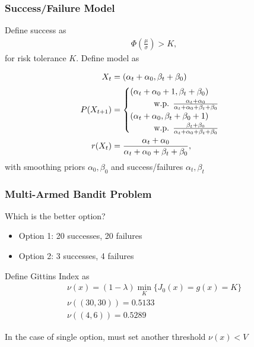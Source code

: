 \documentclass[compress, xcolor=pst]{beamer}
\newcommand\tab[1][1cm]{\hspace*{#1}}
\begin{document}
\begin{frame}
	\frametitle{\textbf{Success/Failure Model}}
	Define success as
	\begin{align*}
		\Phi(\frac{\mu}{\sigma}) > K,
	\end{align*}
	for risk tolerance $K$. Define model as

	\begin{align*}
	  X_t &= (\alpha_t + \alpha_0, \beta_t + \beta_0) \\
	  P(X_{t+1}) &=
	  \begin{cases}
	      (\alpha_t + \alpha_0 + 1, \beta_t + \beta_0)
	      \\ \tab\text{w.p. } \frac{\alpha_t + \alpha_0}{\alpha_t + \alpha_0 + \beta_t + \beta_0}\\
	      (\alpha_t + \alpha_0, \beta_t + \beta_0 + 1)
	      \\ \tab\text{w.p. } \frac{\beta_t + \beta_0}{\alpha_t + \alpha_0 + \beta_t + \beta_0}
	  \end{cases}\\
	  r(X_t) &= \frac{\alpha_t + \alpha_0}{\alpha_t + \alpha_0 + \beta_t + \beta_0},
	\end{align*}
	with smoothing priors $\alpha_0,\beta_0$ and success/failures $\alpha_t,\beta_t$
\end{frame}

\begin{frame}
	\frametitle{\textbf{Multi-Armed Bandit Problem}}
	Which is the better option?
	\begin{itemize}
		\item Option 1: 20 successes, 20 failures
		\item Option 2: 3 successes, 4 failures
	\end{itemize}
	Define Gittins Index as
	\begin{gather*}
	  \nu(x) = (1-\lambda)\min_{K} \{J_0(x) = g(x) = K\}\\
	  \nu((30, 30)) = 0.5133\\
	  \nu((4, 6)) = 0.5289
	\end{gather*}

	In the case of single option, must set another threshold $\nu(x) < V$
\end{frame}
\end{document}
